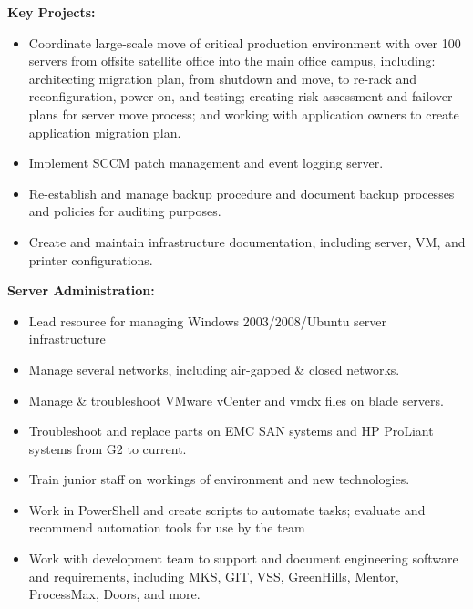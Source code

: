 \documentclass[]{article}
\providecommand{\tightlist}{%
  \setlength{\itemsep}{0pt}\setlength{\parskip}{0pt}}
\begin{document}
\textbf{Key Projects:}

\begin{itemize}
\tightlist
\item
  Coordinate large-scale move of critical production environment with
  over 100 servers from offsite satellite office into the main office
  campus, including: architecting migration plan, from shutdown and
  move, to re-rack and reconfiguration, power-on, and testing; creating
  risk assessment and failover plans for server move process; and
  working with application owners to create application migration plan.
\item
  Implement SCCM patch management and event logging server.
\item
  Re-establish and manage backup procedure and document backup processes
  and policies for auditing purposes.
\item
  Create and maintain infrastructure documentation, including server,
  VM, and printer configurations.
\end{itemize}

\textbf{Server Administration:}

\begin{itemize}
\tightlist
\item
  Lead resource for managing Windows 2003/2008/Ubuntu server
  infrastructure
\item
  Manage several networks, including air-gapped \& closed networks.
\item
  Manage \& troubleshoot VMware vCenter and vmdx files on blade servers.
\item
  Troubleshoot and replace parts on EMC SAN systems and HP ProLiant
  systems from G2 to current.
\item
  Train junior staff on workings of environment and new technologies.
\item
  Work in PowerShell and create scripts to automate tasks; evaluate and
  recommend automation tools for use by the team
\item
  Work with development team to support and document engineering
  software and requirements, including MKS, GIT, VSS, GreenHills,
  Mentor, ProcessMax, Doors, and more.
\end{itemize}
\end{document}

